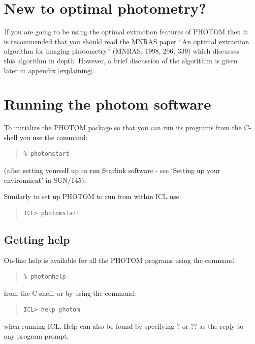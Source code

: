 \documentclass[twoside,11pt]{article}
\newcommand{\htmladdnormallink}[2]{#1}
\newcommand{\htmlref}[2]{#1}
\newcommand{\latex}[1]{#1}
\newcommand{\xref}[3]{#1}
\newcommand{\xlabel}[1]{}
\renewcommand{\_}{\texttt{\symbol{95}}}
\begin{document}
\section{\xlabel{new_to_optimal_photometry}New to optimal photometry?}

If you are going to be using the optimal extraction features of PHOTOM then
it is recommended that you should read the MNRAS paper ``An optimal extraction algorithm for imaging photometry'' (\htmladdnormallink{MNRAS, 1998, 296, 339}{http://cdsads.u-strasbg.fr/cgi-bin/nph-bib_query?bibcode=1998MNRAS.296..339N&db_key=AST\&{}high=365efe227210385}) which discusses this algorithm in depth. However, a brief \htmlref{discussion}{explaining} of the algorithim is given later \latex{in appendix \ref{explaining}}.

\section{\xlabel{running_the_photom_software}Running the photom software}

To initialize the PHOTOM package so that you can run its programs from
the C-shell you use the command:
\begin{quote}
\begin{verbatim}
% photomstart
\end{verbatim}
\end{quote}
(after setting yourself up to run Starlink software -
see `Setting up your environment' in \xref{SUN/145}{sun145}{}).

Similarly to set up PHOTOM to run from within \xref{ICL}{sg5}{} use:
\begin{quote}
\begin{verbatim}
ICL> photomstart
\end{verbatim}
\end{quote}

\subsection{\xlabel{getting_help}Getting help}

On-line help is available for all the PHOTOM programs using the command:
\begin{quote}
\begin{verbatim}
% photomhelp
\end{verbatim}
\end{quote}
from the C-shell, or by using the command:
\begin{quote}
\begin{verbatim}
ICL> help photom
\end{verbatim}
\end{quote}
when running ICL. Help can also be found by specifying ? or ?? as the
reply to any program prompt.
\end{document}
